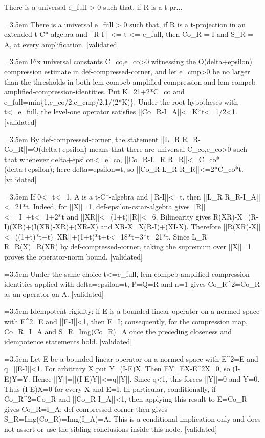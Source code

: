 \documentclass{article}
\newcommand{\step}[1]{\par\noindent\hangindent=3.5em\hangafter=1%
  \makebox[3.5em][l]{\textbf{#1.}}}
\newcommand{\steptag}[1]{\hfill{\small\textsf{[#1]}}}
\begin{document}
\begin{proofbox}{There is a universal e\_full > 0 such that, if R is a t-pr...}
\step{1} There is a universal e\_full > 0 such that, if R is a t-projection in an extended t-C*-algebra and ||R-I|| <= t <= e\_full, then Co\_R = I and S\_R = A, at every amplification. \steptag{validated} \\[6pt]
\step{1.1} Fix universal constants C\_co,e\_co>0 witnessing the O(delta+epsilon) compression estimate in def-compressed-corner, and let e\_cmp>0 be no larger than the thresholds in both lem-compcb-amplified-compression and lem-compcb-amplified-compression-identities. Put K=21+2*C\_co and e\_full=min\{1,e\_co/2,e\_cmp/2,1/(2*K)\}. Under the root hypotheses with t<=e\_full, the level-one operator satisfies ||Co\_R-I\_A||<=K*t<=1/2<1. \steptag{validated} \\[6pt]
\step{1.1.1} By def-compressed-corner, the statement ||L\_R R\_R-Co\_R||=O(delta+epsilon) means that there are universal C\_co,e\_co>0 such that whenever delta+epsilon<=e\_co, ||Co\_R-L\_R R\_R||<=C\_co*(delta+epsilon); here delta=epsilon=t, so ||Co\_R-L\_R R\_R||<=2*C\_co*t. \steptag{validated} \\[4pt]
\step{1.1.2} If 0<=t<=1, A is a t-C*-algebra and ||R-I||<=t, then ||L\_R R\_R-I\_A||<=21*t. Indeed, for ||X||=1, def-epsilon-cstar-algebra gives ||R||<=||I||+t<=1+2*t and ||XR||<=(1+t)||R||<=6. Bilinearity gives R(XR)-X=(R-I)(XR)+(I(XR)-XR)+(XR-X) and XR-X=X(R-I)+(XI-X). Therefore ||R(XR)-X||<=((1+t)*t+t)||XR||+(1+t)*t+t<=18*t+3*t=21*t. Since L\_R R\_R(X)=R(XR) by def-compressed-corner, taking the supremum over ||X||=1 proves the operator-norm bound. \steptag{validated} \\[4pt]
\step{1.2} Under the same choice t<=e\_full, lem-compcb-amplified-compression-identities applied with delta=epsilon=t, P=Q=R and n=1 gives Co\_R\textasciicircum{}2=Co\_R as an operator on A. \steptag{validated} \\[4pt]
\step{1.3} Idempotent rigidity: if E is a bounded linear operator on a normed space with E\textasciicircum{}2=E and ||E-I||<1, then E=I; consequently, for the compression map, Co\_R=I\_A and S\_R=Img(Co\_R)=A once the preceding closeness and idempotence statements hold. \steptag{validated} \\[6pt]
\step{1.3.1} Let E be a bounded linear operator on a normed space with E\textasciicircum{}2=E and q=||E-I||<1. For arbitrary X put Y=(I-E)X. Then EY=EX-E\textasciicircum{}2X=0, so (I-E)Y=Y. Hence ||Y||=||(I-E)Y||<=q||Y||. Since q<1, this forces ||Y||=0 and Y=0. Thus (I-E)X=0 for every X and E=I. In particular, conditionally, if Co\_R\textasciicircum{}2=Co\_R and ||Co\_R-I\_A||<1, then applying this result to E=Co\_R gives Co\_R=I\_A; def-compressed-corner then gives S\_R=Img(Co\_R)=Img(I\_A)=A. This is a conditional implication only and does not assert or use the sibling conclusions inside this node. \steptag{validated} \\[6pt]

\end{proofbox}
\end{document}
